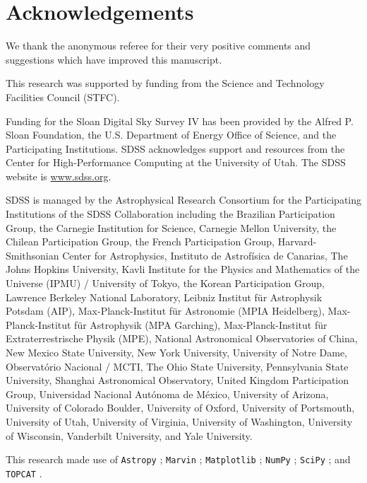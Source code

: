 \documentclass[fleqn,usenatbib]{mnras}
\begin{document}
\section*{Acknowledgements}

We thank the anonymous referee for their very positive comments and suggestions which have improved this manuscript.

This research was supported by funding from the Science and Technology Facilities Council (STFC).

Funding for the Sloan Digital Sky Survey IV has been provided by the Alfred P. Sloan Foundation, the U.S. Department of Energy Office of Science, and the Participating Institutions. SDSS acknowledges support and resources from the Center for High-Performance Computing at the University of Utah. The SDSS website is \url{www.sdss.org}.

SDSS is managed by the Astrophysical Research Consortium for the Participating Institutions of the SDSS Collaboration including the Brazilian Participation Group, the Carnegie Institution for Science, Carnegie Mellon University, the Chilean Participation Group, the French Participation Group, Harvard-Smithsonian Center for Astrophysics, Instituto de Astrof{\'i}sica de Canarias, The Johns Hopkins University, Kavli Institute for the Physics and Mathematics of the Universe (IPMU) / University of Tokyo, the Korean Participation Group, Lawrence Berkeley National Laboratory, Leibniz Institut f{\"u}r Astrophysik Potsdam (AIP), Max-Planck-Institut f{\"u}r Astronomie (MPIA Heidelberg), Max-Planck-Institut f{\"u}r Astrophysik (MPA Garching), Max-Planck-Institut f{\"u}r Extraterrestrische Physik (MPE), National Astronomical Observatories of China, New Mexico State University, New York University, University of Notre Dame, Observat{\'o}rio Nacional / MCTI, The Ohio State University, Pennsylvania State University, Shanghai Astronomical Observatory, United Kingdom Participation Group, Universidad Nacional Aut{\'o}noma de M{\'e}xico, University of Arizona, University of Colorado Boulder, University of Oxford, University of Portsmouth, University of Utah, University of Virginia, University of Washington, University of Wisconsin, Vanderbilt University, and Yale University.

This research made use of \texttt{Astropy} \citep{Robitaille2013Astropy:Astronomy}; \texttt{Marvin} \citep{Cherinka2018Marvin:Set}; \texttt{Matplotlib} \citep{Hunter2007Matplotlib:Environment}; \texttt{NumPy} \citep{VanderWalt2011TheComputation}; \texttt{SciPy} \citep{Virtanen2020SciPyPython}; and \texttt{TOPCAT} \citep{Taylor2005TOPCATSoftware}.
\end{document}
